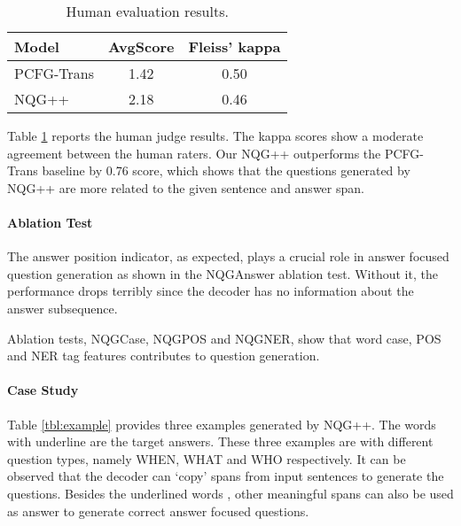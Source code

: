 \documentclass[11pt,letterpaper]{article}
\newcommand{\ourModelName}{NQG}
\begin{document}
\begin{table}[htbp]
	\small
	\begin{center}
		\begin{tabular}{lcc}
			\toprule
			\textbf{Model} &  AvgScore & Fleiss' kappa  \\
			\midrule
			PCFG-Trans & 1.42 & 0.50 \\
			\ourModelName{}++ & 2.18 & 0.46  \\
			\bottomrule
		\end{tabular}
	\end{center}
	\caption{\label{tbl:humanEva} Human evaluation results.}
\end{table}

Table \ref{tbl:humanEva} reports the human judge results.
The kappa scores show a moderate agreement between the human raters.
Our \ourModelName{}++ outperforms the PCFG-Trans baseline by 0.76 score, which shows that the questions generated by \ourModelName{}++ are more related to the given sentence and answer span.

\paragraph{Ablation Test}
The answer position indicator, as expected, plays a crucial role in answer focused question generation as shown in the \ourModelName{}Answer ablation test.
Without it, the performance drops terribly since the decoder has no information about the answer subsequence.

Ablation tests, \ourModelName{}Case, \ourModelName{}POS and \ourModelName{}NER,  show that word case, POS and NER tag features contributes to question generation.


\paragraph{Case Study}
Table \ref{tbl:example} provides three examples generated by \ourModelName{}++.
The words with underline are the target answers.
These three examples are with different question types, namely WHEN, WHAT and WHO respectively.
It can be observed that the decoder can `copy' spans from input sentences to generate the questions.
Besides the underlined words , other meaningful spans can also be used as answer to generate correct answer focused questions.
\end{document}

